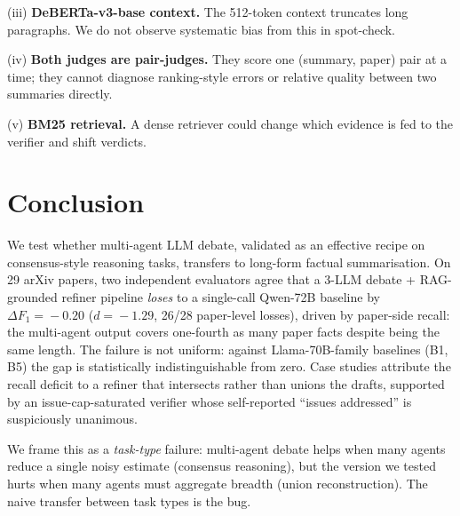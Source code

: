 \documentclass[11pt,a4paper]{article}
\begin{document}
(iii) \textbf{DeBERTa-v3-base context.} The 512-token context truncates
long paragraphs. We do not observe systematic bias from this in
spot-check.

(iv) \textbf{Both judges are pair-judges.} They score one (summary,
paper) pair at a time; they cannot diagnose ranking-style errors or
relative quality between two summaries directly.

(v) \textbf{BM25 retrieval.} A dense retriever could change which
evidence is fed to the verifier and shift verdicts.

\section{Conclusion}
\label{sec:conclusion}

We test whether multi-agent LLM debate, validated as an effective
recipe on consensus-style reasoning tasks, transfers to long-form
factual summarisation. On 29 arXiv papers, two independent evaluators
agree that a 3-LLM debate + RAG-grounded refiner pipeline \emph{loses}
to a single-call Qwen-72B baseline by $\Delta F_1\!=\!-0.20$ ($d\!=\!-1.29$,
26/28 paper-level losses), driven by paper-side recall: the multi-agent
output covers one-fourth as many paper facts despite being the same
length. The failure is not uniform: against Llama-70B-family baselines
(B1, B5) the gap is statistically indistinguishable from zero. Case
studies attribute the recall deficit to a refiner that intersects
rather than unions the drafts, supported by an issue-cap-saturated
verifier whose self-reported ``issues addressed'' is suspiciously
unanimous.

We frame this as a \emph{task-type} failure: multi-agent debate helps
when many agents reduce a single noisy estimate (consensus reasoning),
but the version we tested hurts when many agents must aggregate breadth
(union reconstruction). The naive transfer between task types is the
bug.
\end{document}
